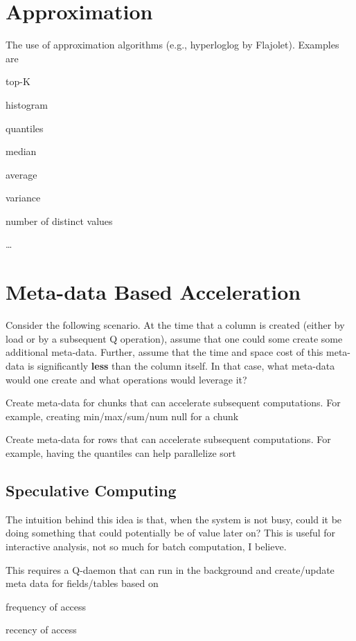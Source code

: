 \section{Approximation}
\label{Approximation}
The use of approximation algorithms (e.g., hyperloglog by Flajolet).
Examples are

\be
\item top-K
\item histogram
\item quantiles
\item median
\item average
\item variance
\item number of distinct values
\item \ldots
\ee

\section{Meta-data Based Acceleration}
\label{Meta_Data_Based_Acceleration}
Consider the following scenario. At the time that a column is created
(either by load or by a subsequent Q operation), assume that one could
some create some additional meta-data. Further, assume that the time and
space cost of this meta-data is significantly {\bf less} than the column
itself. In that case, what meta-data would one create and what
operations would leverage it?

\bi
\item Create meta-data for chunks that can accelerate subsequent computations.
For example, creating min/max/sum/num null for a chunk 
\item Create meta-data for rows that can accelerate subsequent
computations. For example, having the quantiles can help parallelize
sort
\ei

\subsection{Speculative Computing}
The intuition behind this idea is that, when the system is not busy,
could it be doing something that could potentially
be of value later on? This is useful for interactive analysis, not so
much for batch computation, I believe.

This requires a Q-daemon that can run in the background and
create/update meta data for fields/tables based on
\be
\item frequency of access
\item recency of access
\ee

